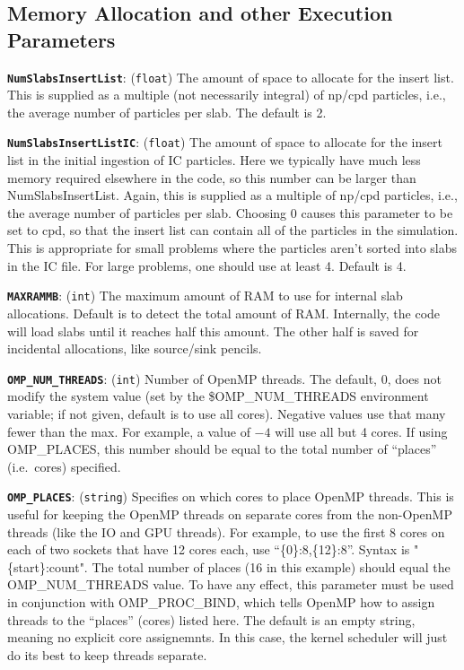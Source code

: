 \documentclass[11pt,preprint]{aastex}
\newcommand{\param}[2]{\medskip\noindent\textbf{\texttt{#1}}: ({\tt #2}) }
\begin{document}
\subsection{Memory Allocation and other Execution Parameters}

\param{NumSlabsInsertList}{float} The amount of space to allocate for
the insert list.  This is supplied as a multiple (not necessarily integral)
of np/cpd particles, i.e., the average number of particles per slab.
The default is 2.

\param{NumSlabsInsertListIC}{float} The amount of space to allocate
for the insert list in the initial ingestion of IC particles.  Here
we typically have much less memory required elsewhere in the code, so
this number can be larger than NumSlabsInsertList.
Again, this is supplied as a multiple of np/cpd particles, i.e., the
average number of particles per slab.  Choosing 0 causes this parameter
to be set to cpd, so that the insert list can contain all of the particles
in the simulation.  This is appropriate for small problems where the
particles aren't sorted into slabs in the IC file.  For large problems,
one should use at least 4.  Default is 4.

\param{MAXRAMMB}{int} The maximum amount of RAM to use for internal slab 
allocations.  Default is to detect the total amount of RAM.  Internally,
the code will load slabs until it reaches half this amount.  The other
half is saved for incidental allocations, like source/sink pencils.

\param{OMP\_NUM\_THREADS}{int} Number of OpenMP threads.  The default, 0, does not modify the system value
(set by the \$OMP\_NUM\_THREADS environment variable; if not given, default is to use all cores).
Negative values use that many fewer than the max.
For example, a value of $-4$ will use all but 4 cores.  If using OMP\_PLACES, this
number should be equal to the total number of ``places'' (i.e.~cores) specified.

\param{OMP\_PLACES}{string} Specifies on which cores to place OpenMP
threads.  This is useful for keeping the OpenMP threads on separate
cores from the non-OpenMP threads (like the IO and GPU threads).
For example, to use the first 8 cores on each of two sockets that have
12 cores each, use ``\{0\}:8,\{12\}:8''.  Syntax is "\{start\}:count".
The total number of places (16 in this example) should equal the OMP\_NUM\_THREADS value.
To have any effect, this parameter must be used in conjunction with
OMP\_PROC\_BIND, which tells OpenMP how to assign threads to the
``places'' (cores) listed here.  
The default is an empty string, meaning no explicit core assignemnts.
In this case, the kernel scheduler will just do its best to keep threads
separate.
\end{document}
